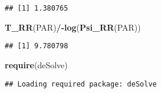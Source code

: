 \documentclass[]{article}
\newenvironment{Shaded}{\begin{snugshade}}{\end{snugshade}}
\newcommand{\KeywordTok}[1]{\textcolor[rgb]{0.13,0.29,0.53}{\textbf{#1}}}
\newcommand{\NormalTok}[1]{#1}
\newcommand{\OperatorTok}[1]{\textcolor[rgb]{0.81,0.36,0.00}{\textbf{#1}}}
\begin{document}
\begin{verbatim}
## [1] 1.380765
\end{verbatim}

\begin{Shaded}
\begin{Highlighting}[]
\KeywordTok{T_RR}\NormalTok{(PAR)}\OperatorTok{/-}\KeywordTok{log}\NormalTok{(}\KeywordTok{Psi_RR}\NormalTok{(PAR))}
\end{Highlighting}
\end{Shaded}

\begin{verbatim}
## [1] 9.780798
\end{verbatim}

\begin{Shaded}
\begin{Highlighting}[]
\KeywordTok{require}\NormalTok{(deSolve)}
\end{Highlighting}
\end{Shaded}

\begin{verbatim}
## Loading required package: deSolve
\end{verbatim}
\end{document}
